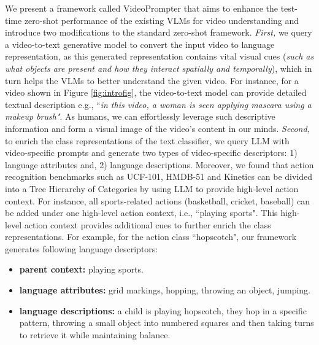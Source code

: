 \documentclass{article} \usepackage{iclr2024_conference,times}
\begin{document}
We present a framework called VideoPrompter that aims to enhance the test-time zero-shot performance of the existing VLMs for video understanding and introduce two modifications to the standard zero-shot framework. \emph{First,} we query a video-to-text generative model to convert the input video to language representation, as this generated representation contains vital visual cues (\emph{such as what objects are present and how they interact spatially and temporally}), which in turn helps the VLMs to better understand the given video. For instance, for a video shown in Figure \ref{fig:introfig}, the video-to-text model can provide detailed textual description e.g., ``\emph{in this video, a woman is seen applying mascara using a makeup brush"}. As humans, we can effortlessly leverage such descriptive information and form a visual image of the video's content in our minds. \emph{Second,} to enrich the class representations of the text classifier, we query LLM with video-specific prompts and generate two types of video-specific descriptors: 1) language attributes and, 2) language descriptions. Moreover, we found that action recognition benchmarks such as UCF-101, HMDB-51 and Kinetics \citep{kuehne2011hmdb, soomro2012ucf101,kay2017kinetics} can be divided into a Tree Hierarchy of Categories by using LLM to provide high-level action context. For instance, all sports-related actions (basketball, cricket, baseball) can be added under one high-level action context, i.e., ``playing sports". This high-level action context provides additional cues to further enrich the class representations. For example,  for the action class ``hopscotch", our framework generates following language descriptors:
{\selectfont\small
\begin{itemize}\setlength{\itemsep}{0em}
        \item \textbf{parent context:} playing sports.
        \item \textbf{language attributes:} grid markings, hopping, throwing an object, jumping.
        \item \textbf{language descriptions:} a child is playing hopscotch, they hop in a specific pattern, throwing a small object into numbered squares and then taking turns to retrieve it while maintaining balance.
\end{itemize}
}
\end{document}
